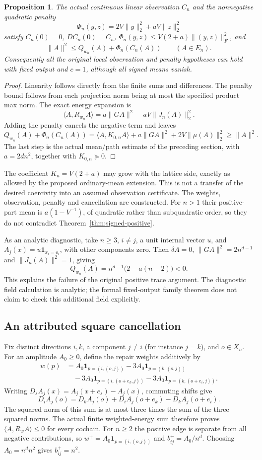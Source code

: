 \documentclass[11pt]{article}
\newtheorem{proposition}[theorem]{Proposition}
\newcommand{\ip}[2]{\langle #1,#2\rangle}
\begin{document}
\begin{proposition}\label{prop:signed-zero}
The actual continuous linear observation $C_n$ and the nonnegative
quadratic penalty
\[
 \Phi_n(y,z)=2V\|y\|_2^2+aV\|z\|_2^2
\]
satisfy $C_n(0)=0$, $DC_n(0)=C_n$,
$\Phi_n(y,z)\leq V(2+a)\|(y,z)\|_F^2$, and
\[
 \|A\|^2\leq Q_{w_n}(A)+\Phi_n(C_n(A))\qquad(A\in E_n).
\]
Consequently all the original local observation and penalty hypotheses
can hold with fixed output and $c=1$, although all signed means vanish.
\end{proposition}
\begin{proof}
Linearity follows directly from the finite sums and differences. The
penalty bound follows from each projection norm being at most the
specified product max norm. The exact energy expansion is
\[
 \ip{A}{R_{w_n}A}=a\|GA\|^2-aV\|J_n(A)\|_2^2.
\]
Adding the penalty cancels the negative term and leaves
\[
 Q_{w_n}(A)+\Phi_n(C_n(A))
   =\ip{A}{K_{0,n}A}+a\|GA\|^2+2V\|\mu(A)\|_2^2
   \geq\|A\|^2.
\]
The last step is the actual mean/path estimate of the preceding section,
with $a=2dn^2$, together with $K_{0,n}\succeq0$.
\end{proof}
The coefficient $K_n=V(2+a)$ may grow with the lattice side, exactly as
allowed by the proposed ordinary-mean extension. This is not a transfer
of the desired coercivity into an assumed observation certificate.
The weights, observation, penalty and cancellation are constructed.
For $n>1$ their positive-part mean is $a(1-V^{-1})$, of quadratic rather
than subquadratic order, so they do not contradict
Theorem~\ref{thm:signed-positive}.

As an analytic diagnostic, take $n\geq3$, $i\ne j$, a unit internal vector
$u$, and $A_j(x)=u\mathbf1_{x_i=o_i}$, with other components zero. Then
$\delta A=0$, $\|GA\|^2=2n^{d-1}$ and $\|J_n(A)\|^2=1$, giving
\[
 Q_{w_n}(A)=n^{d-1}\bigl(2-a(n-2)\bigr)<0.
\]
This explains the failure of the original positive trace argument.
The diagnostic field calculation is analytic; the formal fixed-output
family theorem does not claim to check this additional field explicitly.

\subsection{An attributed square cancellation}
Fix distinct directions $i,k$, a component $j\ne i$ (for instance $j=k$),
and $o\in X_n$. For an amplitude $A_0\geq0$, define the repair
weights additively by
\begin{align*}
 w(p)&=A_0\mathbf1_{p=(i,(o,j))}
       -3A_0\mathbf1_{p=(k,(o,j))}\\
     &\quad-3A_0\mathbf1_{p=(i,(o+e_k,j))}
       -3A_0\mathbf1_{p=(k,(o+e_i,j))}.
\end{align*}
Writing $D_s A_j(x)=A_j(x+e_s)-A_j(x)$, commuting shifts give
\[
 D_i A_j(o)=D_k A_j(o)+D_i A_j(o+e_k)-D_k A_j(o+e_i).
\]
The squared norm of this sum is at most three times the sum of the
three squared norms. The actual finite weighted-energy sum therefore
proves $\ip{A}{R_wA}\leq0$ for every cochain.
For $n\geq2$ the positive edge is separate from all negative contributions,
so $w^+=A_0\mathbf1_{p=(i,(o,j))}$ and $b^+_{ij}=A_0/n^d$.
Choosing $A_0=n^d n^2$ gives $b^+_{ij}=n^2$.
\end{document}
